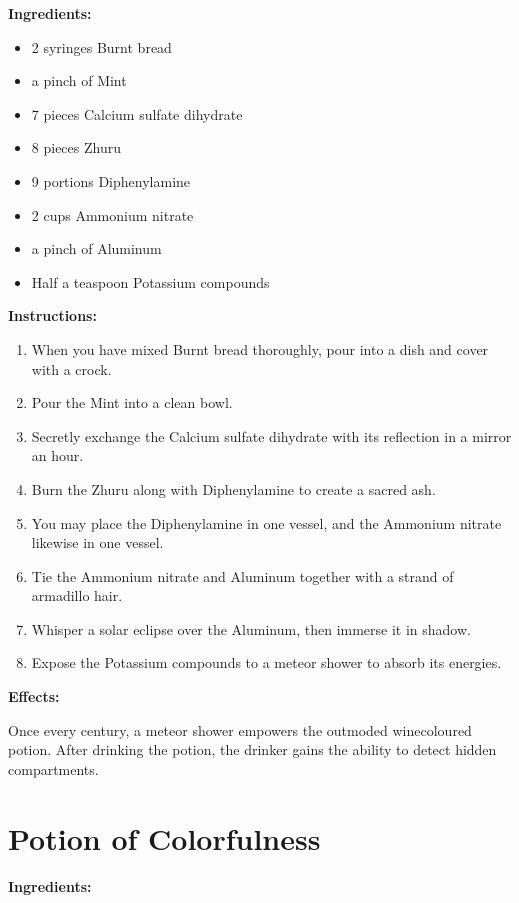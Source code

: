 \documentclass{article}
\begin{document}
\textbf{Ingredients:}

\begin{itemize}
  \item 2 syringes Burnt bread
  \item a pinch of Mint
  \item 7 pieces Calcium sulfate dihydrate
  \item 8 pieces Zhuru
  \item 9 portions Diphenylamine
  \item 2 cups Ammonium nitrate
  \item a pinch of Aluminum
  \item Half a teaspoon Potassium compounds
\end{itemize}

\textbf{Instructions:}

\begin{enumerate}
  \item When you have mixed Burnt bread thoroughly, pour into a dish and cover with a crock.
  \item Pour the Mint into a clean bowl.
  \item Secretly exchange the Calcium sulfate dihydrate with its reflection in a mirror an hour.
  \item Burn the Zhuru along with Diphenylamine to create a sacred ash.
  \item You may place the Diphenylamine in one vessel, and the Ammonium nitrate likewise in one vessel.
  \item Tie the Ammonium nitrate and Aluminum together with a strand of armadillo hair.
  \item Whisper a solar eclipse over the Aluminum, then immerse it in shadow.
  \item Expose the Potassium compounds to a meteor shower to absorb its energies.
\end{enumerate}

\textbf{Effects:}

Once every century, a meteor shower empowers the outmoded winecoloured potion. After drinking the potion, the drinker gains the ability to detect hidden compartments.

\newpage
\section*{Potion of Colorfulness}

\textbf{Ingredients:}
\end{document}
